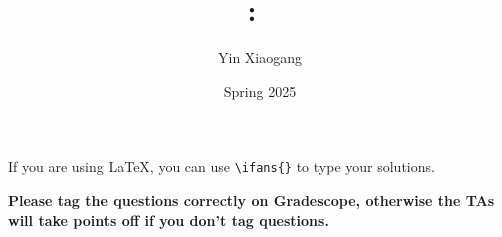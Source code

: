 \documentclass[answers]{exam}
\title{
\vspace{-1in}
\textmd{\textbf{\hmwkClass:\ \hmwkTitle}}
}
\author{Yin Xiaogang}
\date{Spring 2025}
\newif\ifanswers
\newcommand{\ifans}[1]{\ifanswers \color{red} \textbf{Solution: } #1 \color{black} \fi}
\begin{document}
\maketitle
\vspace{-3em}

\textbf{}



If you are using LaTeX, you can use \verb!\ifans{}! to type your solutions.

\textbf{Please tag the questions correctly on Gradescope, otherwise the TAs will take points off if you don't tag questions.}
\begin{questions}
    
    \newpage
   
    \newpage

\end{questions}


\end{document}
